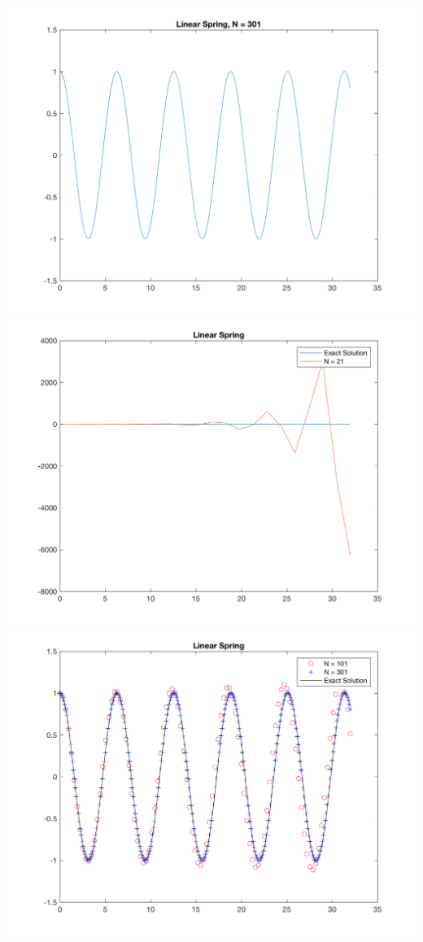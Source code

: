 \documentclass[11pt, oneside]{article}
\begin{document}
\begin{enumerate}
\begin{center}
        \includegraphics[scale=.6]{Figures/01_03.png}
        \includegraphics[scale=.6]{Figures/01_04.png}
        \includegraphics[scale=.6]{Figures/01_05.png}
      \end{center}


\end{enumerate}
\end{document}
